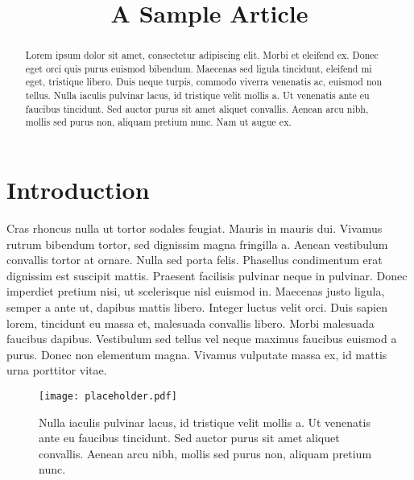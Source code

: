 \documentclass[modern]{aastex62}
\begin{document}
\title{A Sample Article}

\mainauthor

\begin{abstract}
    Lorem ipsum dolor sit amet, consectetur adipiscing elit. Morbi et eleifend ex. Donec eget orci quis purus euismod bibendum. Maecenas sed ligula tincidunt, eleifend mi eget, tristique libero. Duis neque turpis, commodo viverra venenatis ac, euismod non tellus. Nulla iaculis pulvinar lacus, id tristique velit mollis a. Ut venenatis ante eu faucibus tincidunt. Sed auctor purus sit amet aliquet convallis. Aenean arcu nibh, mollis sed purus non, aliquam pretium nunc. Nam ut augue ex.
\end{abstract}

\section{Introduction}
Cras rhoncus nulla ut tortor sodales feugiat. Mauris in mauris dui. Vivamus rutrum bibendum tortor, sed dignissim magna fringilla a. Aenean vestibulum convallis tortor at ornare. Nulla sed porta felis. Phasellus condimentum erat dignissim est suscipit mattis. Praesent facilisis pulvinar neque in pulvinar. Donec imperdiet pretium nisi, ut scelerisque nisl euismod in. Maecenas justo ligula, semper a ante ut, dapibus mattis libero. Integer luctus velit orci. Duis sapien lorem, tincidunt eu massa et, malesuada convallis libero. Morbi malesuada faucibus dapibus. Vestibulum sed tellus vel neque maximus faucibus euismod a purus. Donec non elementum magna. Vivamus vulputate massa ex, id mattis urna porttitor vitae.

\begin{figure}[t!]
    \begin{centering}
        \texttt{[image: placeholder.pdf]}
        \caption{
            Nulla iaculis pulvinar lacus, id tristique velit mollis a. Ut venenatis ante eu faucibus tincidunt. Sed auctor purus sit amet aliquet convallis. Aenean arcu nibh, mollis sed purus non, aliquam pretium nunc.
        }
    \end{centering}
\end{figure}

\clearpage

\end{document}
